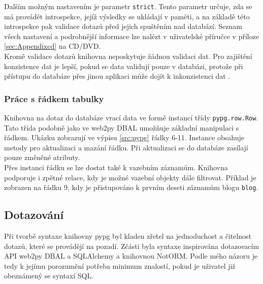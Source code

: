\documentclass[ing,male,java,dept456]{diploma}						%
\begin{document}
Dalším možným nastavením je parametr \lstinline[style=inlinepython]|strict|. Tento parametr určuje, zda se má provádět introspekce, jejíž výsledky se ukládají v paměti, a na základě této introspekce pak validace dotazů před jejich spuštěním nad databází. Seznam všech nastavení a podrobnější informace lze nalézt v uživatelské příručce v příloze \ref{sec:Appendixcd} na CD/DVD. \\
Kromě validace dotazů knihovna neposkytuje žádnou validaci dat. Pro zajištění konzistence dat je lepší, pokud se data validují pouze v databázi, protože při přístupu do databáze přes jinou aplikaci může dojít k inkonzistenci dat \cite{notorm-why}. \\

\subsubsection{Práce s řádkem tabulky}

Knihovna na dotaz do databáze vrací data ve formě instancí třídy \lstinline[style=inlinepython]|pypg.row.Row|. Tato třída podobně jako ve web2py DBAL umožňuje základní manipulaci s řádkem. Ukázku zobrazují ve výpisu \ref{src:pypg} řádky 6-11. Instance obsahuje metody pro aktualizaci a mazání řádku. Při aktualizaci se do databáze zasílají pouze změněné atributy. \\
Přes instanci řádku se lze dostat také k vazebním záznamům. Knihovna podporuje i zpětné relace, kdy je možné vazební objekty dále filtrovat. Příklad je zobrazen na řádku 9, kdy je přistupováno k prvním deseti záznamům blogu \lstinline[style=inlinepython]|blog|.

\subsection{Dotazování}

Při tvorbě syntaxe knihovny pypg byl kladen zřetel na jednoduchost a čitelnost dotazů, které se provádějí na pozadí. Zčásti byla syntaxe inspirována dotazovacím API web2py DBAL a SQLAlchemy a knihovnou NotORM. Podle mého názoru je tedy k jejímu porozumění potřeba minimum znalostí, pokud je uživatel již obeznámený se syntaxí SQL. \\
\end{document}

